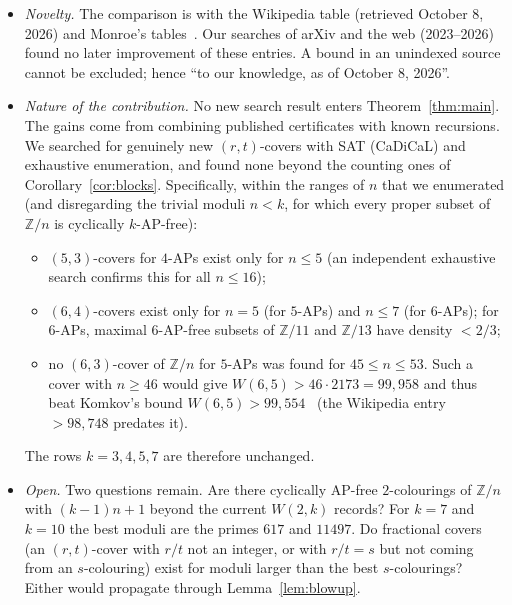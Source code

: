 \documentclass[11pt]{article}
\numberwithin{equation}{section}
\theoremstyle{definition}
\theoremstyle{remark}
\newcommand{\Z}{\mathbb Z}
\newcommand{\W}{W}
\begin{document}
\begin{itemize}
\item \emph{Novelty.}  The comparison is with the Wikipedia table (retrieved October 8, 2026)
  and Monroe's tables~\cite{Mon22,Mon25}.  Our searches of arXiv and the web (2023--2026) found no
  later improvement of these entries.  A bound in an unindexed source cannot be excluded; hence
  ``to our knowledge, as of October 8, 2026''.
\item \emph{Nature of the contribution.}  No new search result enters Theorem~\ref{thm:main}.  The
  gains come from combining published certificates with known recursions.  We searched for
  genuinely new $(r,t)$-covers with SAT (CaDiCaL) and exhaustive enumeration, and found none
  beyond the counting ones of Corollary~\ref{cor:blocks}.  Specifically, within the ranges of
  $n$ that we enumerated (and disregarding the trivial moduli $n<k$, for which every proper
  subset of $\Z/n$ is cyclically $k$-AP-free):
  \begin{itemize}
  \item $(5,3)$-covers for $4$-APs exist only for $n\le5$ (an independent exhaustive search
    confirms this for all $n\le16$);
  \item $(6,4)$-covers exist only for $n=5$ (for $5$-APs) and $n\le7$ (for $6$-APs); for
    $6$-APs, maximal $6$-AP-free subsets of $\Z/11$ and $\Z/13$ have density $<2/3$;
  \item no $(6,3)$-cover of $\Z/n$ for $5$-APs was found for $45\le n\le53$.  Such a cover with
    $n\ge46$ would give $\W(6,5)>46\cdot2173=99{,}958$ and thus beat Komkov's bound
    $\W(6,5)>99{,}554$~\cite{Kom20} (the Wikipedia entry $>98{,}748$ predates it).
  \end{itemize}
  The rows $k=3,4,5,7$ are therefore unchanged.
\item \emph{Open.}  Two questions remain.  Are there cyclically AP-free $2$-colourings of
  $\Z/n$ with $(k-1)n+1$ beyond the current $\W(2,k)$ records?  For $k=7$ and $k=10$ the best
  moduli are the primes $617$ and $11497$.  Do fractional covers (an $(r,t)$-cover with $r/t$
  not an integer, or with $r/t=s$ but not coming from an $s$-colouring) exist for moduli larger
  than the best $s$-colourings?  Either would propagate through Lemma~\ref{lem:blowup}.
\end{itemize}
\end{document}
